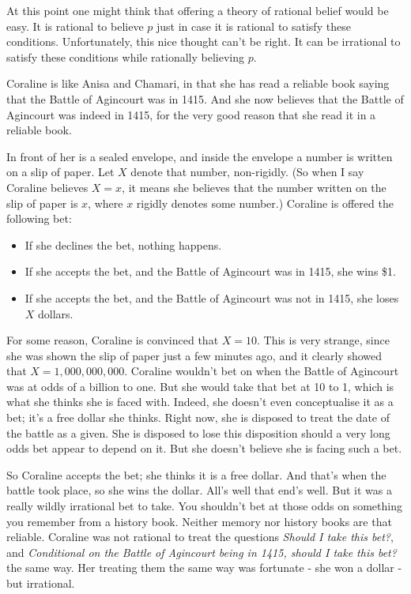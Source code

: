 \documentclass[11pt,]{book}
\providecommand{\tightlist}{%
  \setlength{\itemsep}{0pt}\setlength{\parskip}{0pt}}
\begin{document}
At this point one might think that offering a theory of rational belief would be easy. It is rational to believe \(p\) just in case it is rational to satisfy these conditions. Unfortunately, this nice thought can't be right. It can be irrational to satisfy these conditions while rationally believing \(p\).

Coraline is like Anisa and Chamari, in that she has read a reliable book saying that the Battle of Agincourt was in 1415. And she now believes that the Battle of Agincourt was indeed in 1415, for the very good reason that she read it in a reliable book.

In front of her is a sealed envelope, and inside the envelope a number is written on a slip of paper. Let \(X\) denote that number, non-rigidly. (So when I say Coraline believes \(X = x\), it means she believes that the number written on the slip of paper is \(x\), where \(x\) rigidly denotes some number.) Coraline is offered the following bet:

\begin{itemize}
\tightlist
\item
  If she declines the bet, nothing happens.
\item
  If she accepts the bet, and the Battle of Agincourt was in 1415, she wins \$1.
\item
  If she accepts the bet, and the Battle of Agincourt was not in 1415, she loses \(X\) dollars.
\end{itemize}

For some reason, Coraline is convinced that \(X = 10\). This is very strange, since she was shown the slip of paper just a few minutes ago, and it clearly showed that \(X = 1,000,000,000\). Coraline wouldn't bet on when the Battle of Agincourt was at odds of a billion to one. But she would take that bet at 10 to 1, which is what she thinks she is faced with. Indeed, she doesn't even conceptualise it as a bet; it's a free dollar she thinks. Right now, she is disposed to treat the date of the battle as a given. She is disposed to lose this disposition should a very long odds bet appear to depend on it. But she doesn't believe she is facing such a bet.

So Coraline accepts the bet; she thinks it is a free dollar. And that's when the battle took place, so she wins the dollar. All's well that end's well. But it was a really wildly irrational bet to take. You shouldn't bet at those odds on something you remember from a history book. Neither memory nor history books are that reliable. Coraline was not rational to treat the questions \emph{Should I take this bet?}, and \emph{Conditional on the Battle of Agincourt being in 1415, should I take this bet?} the same way. Her treating them the same way was fortunate - she won a dollar - but irrational.
\end{document}
